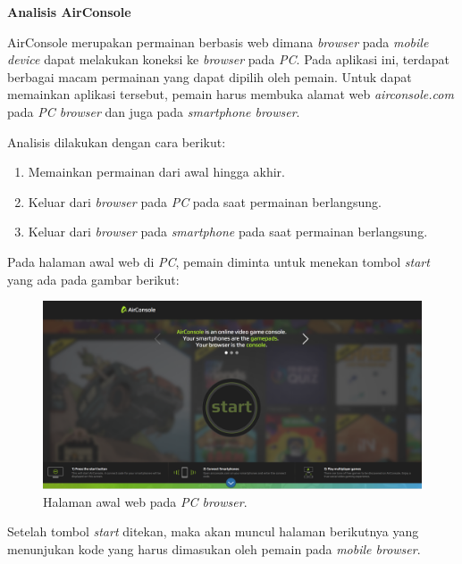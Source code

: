 \documentclass[a4paper,twoside]{article}
\begin{document}
\begin{enumerate}
		\textbf{Analisis AirConsole} 
		
		AirConsole merupakan permainan berbasis web dimana \textit{browser} pada \textit{mobile device} dapat melakukan koneksi ke \textit{browser} pada  \textit{PC}. Pada aplikasi ini, terdapat berbagai macam permainan yang dapat dipilih oleh pemain. Untuk dapat memainkan aplikasi tersebut, pemain harus membuka alamat web \textit{airconsole.com} pada \textit{PC browser} dan juga pada \textit{smartphone browser}.
		
		Analisis dilakukan dengan cara berikut:
		\begin{enumerate}
			\item Memainkan permainan dari awal hingga akhir.
			\item Keluar dari \textit{browser} pada \textit{PC} pada saat permainan berlangsung.
			\item Keluar dari \textit{browser} pada \textit{smartphone} pada saat permainan berlangsung.
		\end{enumerate}
		Pada halaman awal web di \textit{PC}, pemain diminta untuk menekan tombol \textit{start} yang ada pada gambar berikut: 
		
		\begin{figure}[H]
			\centering
			\includegraphics[scale=0.3]{Gambar/con1_home1}
			\caption{Halaman awal web pada \textit{PC browser}.}
			\label{fig:16_con1_home1}
		\end{figure}
	
		Setelah tombol \textit{start} ditekan, maka akan muncul halaman berikutnya yang menunjukan kode yang harus dimasukan oleh pemain pada \textit{mobile browser}. 
		

\end{enumerate}
\end{document}
